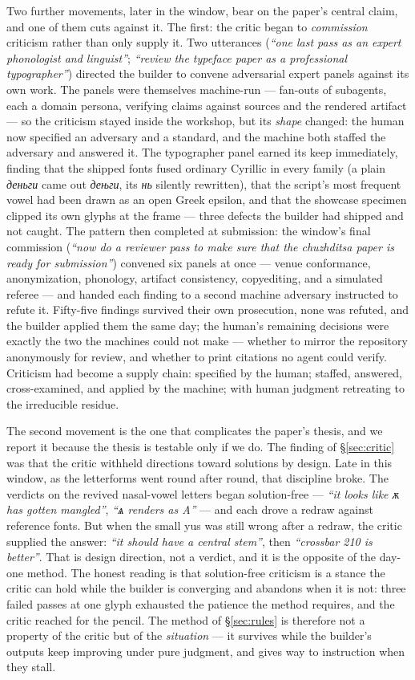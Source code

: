 \documentclass[11pt]{article}
\newcommand{\cz}[1]{{\chu #1}}
\begin{document}
Two further movements, later in the window, bear on the paper's central claim, and one of them cuts against it. The first: the critic began to \emph{commission} criticism rather than only supply it. Two utterances (\emph{``one last pass as an expert phonologist and linguist''}; \emph{``review the typeface paper as a professional typographer''}) directed the builder to convene adversarial expert panels against its own work. The panels were themselves machine-run — fan-outs of subagents, each a domain persona, verifying claims against sources and the rendered artifact — so the criticism stayed inside the workshop, but its \emph{shape} changed: the human now specified an adversary and a standard, and the machine both staffed the adversary and answered it. The typographer panel earned its keep immediately, finding that the shipped fonts fused ordinary Cyrillic in every family (a plain \emph{деньги} came out \emph{дењги}, its \emph{нь} silently rewritten), that the script's most frequent vowel had been drawn as an open Greek epsilon, and that the showcase specimen clipped its own glyphs at the frame — three defects the builder had shipped and not caught. The pattern then completed at submission: the window's final commission (\emph{``now do a reviewer pass to make sure that the chuzhditsa paper is ready for submission''}) convened six panels at once — venue conformance, anonymization, phonology, artifact consistency, copyediting, and a simulated referee — and handed each finding to a second machine adversary instructed to refute it. Fifty-five findings survived their own prosecution, none was refuted, and the builder applied them the same day; the human's remaining decisions were exactly the two the machines could not make — whether to mirror the repository anonymously for review, and whether to print citations no agent could verify. Criticism had become a supply chain: specified by the human; staffed, answered, cross-examined, and applied by the machine; with human judgment retreating to the irreducible residue.

The second movement is the one that complicates the paper's thesis, and we report it because the thesis is testable only if we do. The finding of \S\ref{sec:critic} was that the critic withheld directions toward solutions by design. Late in this window, as the letterforms went round after round, that discipline broke. The verdicts on the revived nasal-vowel letters began solution-free — \emph{``it looks like \cz{ѫ} has gotten mangled''}, \emph{``\cz{ѧ} renders as A''} — and each drove a redraw against reference fonts. But when the small yus was still wrong after a redraw, the critic supplied the answer: \emph{``it should have a central stem''}, then \emph{``crossbar 210 is better''}. That is design direction, not a verdict, and it is the opposite of the day-one method. The honest reading is that solution-free criticism is a stance the critic can hold while the builder is converging and abandons when it is not: three failed passes at one glyph exhausted the patience the method requires, and the critic reached for the pencil. The method of \S\ref{sec:rules} is therefore not a property of the critic but of the \emph{situation} — it survives while the builder's outputs keep improving under pure judgment, and gives way to instruction when they stall.
\end{document}
